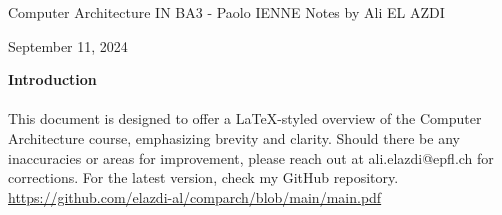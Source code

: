
\begin{titlepage}
    \centering
    \vspace*{1cm}
    \Huge
    Computer Architecture \newline
    \vspace{10px}
    \LARGE IN BA3 - Paolo IENNE
    \vspace*{10px}
    \newline
    \Large Notes by Ali EL AZDI

    \vfill
    \large
    September 11, 2024
\end{titlepage}

\begin{center}
    \vspace*{1cm}
    \textbf{Introduction}
    \newline
    \paragraph[short]{}{This document is designed to offer a LaTeX-styled overview of the Computer Architecture course, emphasizing brevity and clarity. Should there be any inaccuracies or areas for improvement, please reach out at ali.elazdi@epfl.ch for corrections. For the latest version, check my GitHub repository.}
    \newline
   \url{
        https://github.com/elazdi-al/comparch/blob/main/main.pdf
    }
    \newline
\end{center}

\tableofcontents


